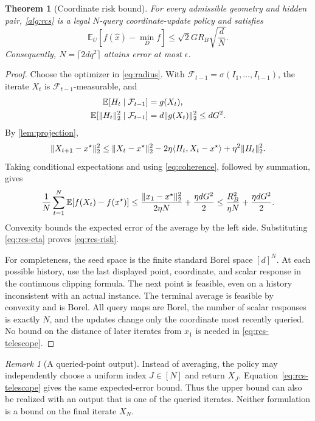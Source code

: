 \documentclass[11pt]{article}
\numberwithin{equation}{section}
\newtheorem{theorem}{Theorem}[section]
\theoremstyle{definition}
\theoremstyle{remark}
\newtheorem{remark}[remark]{Remark}
\newcommand{\E}{\mathbb E}
\newcommand{\eps}{\epsilon}
\DeclarePairedDelimiter{\norm}{\lVert}{\rVert}
\newcommand{\ip}[2]{\langle #1,#2\rangle}
\begin{document}
\begin{theorem}[Coordinate risk bound]\label{thm:rcs}
For every admissible geometry and hidden pair, \cref{alg:rcs} is a legal $N$-query coordinate-update policy and satisfies
\begin{equation}\label{eq:rcs-risk}
\E_U[f(\widehat x)-\min_D f]
\le\sqrt2GR_B\sqrt{\frac dN}.
\end{equation}
Consequently, $N=\lceil2dq^2\rceil$ attains error at most $\eps$.
\end{theorem}
\begin{proof}
Choose the optimizer in \eqref{eq:radius}. With $\mathcal F_{t-1}=\sigma(I_1,\ldots,I_{t-1})$, the iterate $X_t$ is $\mathcal F_{t-1}$-measurable, and
\begin{align}
\E[H_t\mid\mathcal F_{t-1}]&=g(X_t),\label{eq:unbiased}\\
\E[\norm{H_t}_2^2\mid\mathcal F_{t-1}]&=d\norm{g(X_t)}_2^2\le dG^2.\label{eq:secondmoment}
\end{align}
By \cref{lem:projection},
\[
\norm{X_{t+1}-x^\star}_2^2
\le \norm{X_t-x^\star}_2^2
-2\eta\ip{H_t}{X_t-x^\star}+\eta^2\norm{H_t}_2^2.
\]
Taking conditional expectations and using \eqref{eq:coherence}, followed by summation, gives
\begin{equation}\label{eq:rcs-telescope}
\frac1N\sum_{t=1}^N\E[f(X_t)-f(x^\star)]
\le \frac{\norm{x_1-x^\star}_2^2}{2\eta N}
+\frac{\eta dG^2}{2}
\le\frac{R_B^2}{\eta N}+\frac{\eta dG^2}{2}.
\end{equation}
Convexity bounds the expected error of the average by the left side. Substituting \eqref{eq:rcs-eta} proves \eqref{eq:rcs-risk}.

For completeness, the seed space is the finite standard Borel space $[d]^N$. At each possible history, use the last displayed point, coordinate, and scalar response in the continuous clipping formula. The next point is feasible, even on a history inconsistent with an actual instance. The terminal average is feasible by convexity and is Borel. All query maps are Borel, the number of scalar responses is exactly $N$, and the updates change only the coordinate most recently queried. No bound on the distance of later iterates from $x_1$ is needed in \eqref{eq:rcs-telescope}.
\end{proof}

\begin{remark}[A queried-point output]
Instead of averaging, the policy may independently choose a uniform index $J\in[N]$ and return $X_J$. Equation~\eqref{eq:rcs-telescope} gives the same expected-error bound. Thus the upper bound can also be realized with an output that is one of the queried iterates. Neither formulation is a bound on the final iterate $X_N$.
\end{remark}
\end{document}
